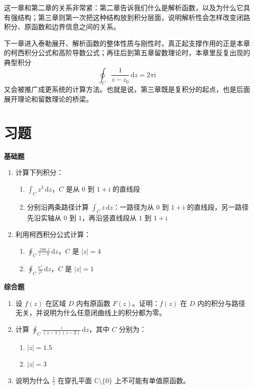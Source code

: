 \begin{tishi}[和后续内容的联系]
这一章和第二章的关系非常紧：第二章告诉我们什么是解析函数，以及为什么它具有强结构；第三章则第一次把这种结构放到积分层面，说明解析性会怎样改变闭路积分、原函数和边界信息之间的关系。

下一章进入泰勒展开、解析函数的整体性质与刚性时，真正起支撑作用的正是本章的柯西积分公式和高阶导数公式；再往后到第五章留数理论时，本章里反复出现的典型积分
\[
    \oint_C \frac{1}{z-z_0}\,\mathrm{d}z=2\pi\mathrm{i}
\]
又会被推广成更系统的计算方法。也就是说，第三章既是复积分的起点，也是后面展开理论和留数理论的桥梁。
\end{tishi}

\section{习题}

\textbf{基础题}

\begin{enumerate}
    \item 计算下列积分：
    \begin{enumerate}
        \item $\displaystyle\int_C z^2\,\mathrm{d}z$，$C$ 是从 $0$ 到 $1 + \mathrm{i}$ 的直线段
        \item 分别沿两条路径计算 $\displaystyle\int_C \overline{z}\,\mathrm{d}z$：一路径为从 $0$ 到 $1+\mathrm{i}$ 的直线段，另一路径先沿实轴从 $0$ 到 $1$，再沿竖直线段从 $1$ 到 $1+\mathrm{i}$
    \end{enumerate}
    
    \item 利用柯西积分公式计算：
    \begin{enumerate}
        \item $\displaystyle\oint_C \frac{\cos z}{z - \pi}\,\mathrm{d}z$，$C$ 是 $|z| = 4$
        \item $\displaystyle\oint_C \frac{\mathrm{e}^z}{z^2}\,\mathrm{d}z$，$C$ 是 $|z| = 1$
    \end{enumerate}
\end{enumerate}

\textbf{综合题}

\begin{enumerate}[resume]
    \item 设 $f(z)$ 在区域 $D$ 内有原函数 $F(z)$。证明：$f(z)$ 在 $D$ 内的积分与路径无关，并说明为什么任意闭曲线上的积分都为零。
    
    \item 计算 $\displaystyle\oint_C \frac{z}{(z - 1)(z - 2)}\,\mathrm{d}z$，其中 $C$ 分别为：
    \begin{enumerate}
        \item $|z| = 1.5$
        \item $|z| = 3$
    \end{enumerate}
    
    \item 说明为什么 $\displaystyle \frac{1}{z}$ 在穿孔平面 $\mathbb{C}\setminus\{0\}$ 上不可能有单值原函数。
\end{enumerate}

